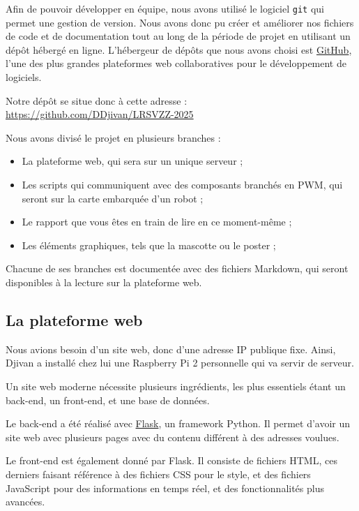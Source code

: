 \documentclass[a4paper,12pt]{report}  %
\begin{document}
Afin de pouvoir développer en équipe, nous avons utilisé le logiciel \texttt{git} qui permet une gestion de version. Nous avons donc pu créer et améliorer nos fichiers de code et de documentation tout au long de la période de projet en utilisant un dépôt hébergé en ligne. L'hébergeur de dépôts que nous avons choisi est \href{https://github.com/}{GitHub}, l'une des plus grandes plateformes web collaboratives pour le développement de logiciels. 

Notre dépôt se situe donc à cette adresse : \href{https://github.com/DDjivan/LRSVZZ-2025}{https://github.com/DDjivan/LRSVZZ-2025}

Nous avons divisé le projet en plusieurs branches : 

\begin{itemize}
	\item La plateforme web, qui sera sur un unique serveur ; 
	
	\item Les scripts qui communiquent avec des composants branchés en PWM, qui seront sur la carte embarquée d'un robot ; 
	
	\item Le rapport que vous êtes en train de lire en ce moment-même ; 
	
	\item Les éléments graphiques, tels que la mascotte ou le poster ; 
	
\end{itemize}

Chacune de ses branches est documentée avec des fichiers Markdown, qui seront disponibles à la lecture sur la plateforme web. 


\subsection{La plateforme web}

Nous avions besoin d'un site web, donc d'une adresse IP publique fixe. Ainsi, Djivan a installé chez lui une Raspberry Pi 2 personnelle qui va servir de serveur. 

Un site web moderne nécessite plusieurs ingrédients, les plus essentiels étant un back-end, un front-end, et une base de données. 

Le back-end a été réalisé avec \href{https://flask.palletsprojects.com/en/stable/}{Flask}, un framework Python. Il permet d'avoir un site web avec plusieurs pages avec du contenu différent à des adresses voulues. 

Le front-end est également donné par Flask. Il consiste de fichiers HTML, ces derniers faisant référence à des fichiers CSS pour le style, et des fichiers JavaScript pour des informations en temps réel, et des fonctionnalités plus avancées. 
\end{document}

